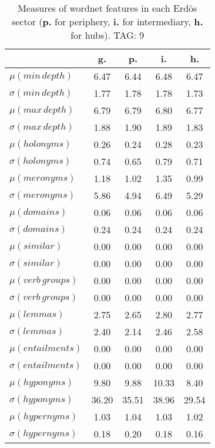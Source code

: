 \begin{table}[h!]
\begin{center}
\begin{tabular}{| l || c | c | c | c |}\hline
 & {\bf g.} & {\bf p.} & {\bf i.} & {\bf h.} \\\hline\hline
$\mu(min\,depth)$ & 6.47  & 6.44  & 6.48  & 6.47 \\
$\sigma(min\,depth)$ & 1.77  & 1.78  & 1.78  & 1.73 \\\hline
$\mu(max\,depth)$ & 6.79  & 6.79  & 6.80  & 6.77 \\
$\sigma(max\,depth)$ & 1.88  & 1.90  & 1.89  & 1.83 \\\hline
$\mu(holonyms)$ & 0.26  & 0.24  & 0.28  & 0.23 \\
$\sigma(holonyms)$ & 0.74  & 0.65  & 0.79  & 0.71 \\\hline
$\mu(meronyms)$ & 1.18  & 1.02  & 1.35  & 0.99 \\
$\sigma(meronyms)$ & 5.86  & 4.94  & 6.49  & 5.29 \\\hline
$\mu(domains)$ & 0.06  & 0.06  & 0.06  & 0.06 \\
$\sigma(domains)$ & 0.24  & 0.24  & 0.24  & 0.24 \\\hline
$\mu(similar)$ & 0.00  & 0.00  & 0.00  & 0.00 \\
$\sigma(similar)$ & 0.00  & 0.00  & 0.00  & 0.00 \\\hline
$\mu(verb\,groups)$ & 0.00  & 0.00  & 0.00  & 0.00 \\
$\sigma(verb\,groups)$ & 0.00  & 0.00  & 0.00  & 0.00 \\\hline
$\mu(lemmas)$ & 2.75  & 2.65  & 2.80  & 2.77 \\
$\sigma(lemmas)$ & 2.40  & 2.14  & 2.46  & 2.58 \\\hline
$\mu(entailments)$ & 0.00  & 0.00  & 0.00  & 0.00 \\
$\sigma(entailments)$ & 0.00  & 0.00  & 0.00  & 0.00 \\\hline
$\mu(hyponyms)$ & 9.80  & 9.88  & 10.33  & 8.40 \\
$\sigma(hyponyms)$ & 36.20  & 35.51  & 38.96  & 29.54 \\\hline
$\mu(hypernyms)$ & 1.03  & 1.04  & 1.03  & 1.02 \\
$\sigma(hypernyms)$ & 0.18  & 0.20  & 0.18  & 0.16 \\\hline
\end{tabular}
\caption{Measures of wordnet features in each Erd\"os sector ({{\bf p.}} for periphery, {{\bf i.}} for intermediary, {{\bf h.}} for hubs). TAG: 9}
\end{center}
\end{table}
